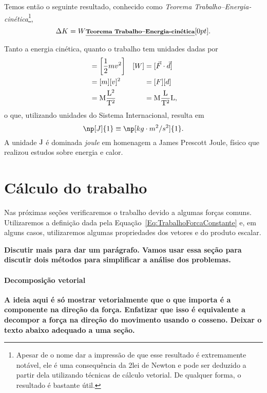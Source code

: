Temos então o seguinte resultado, conhecido como \emph{Teorema Trabalho--Energia-cinética}\footnote[][15mm]{Apesar de o nome dar a impressão de que esse resultado é extremamente notável, ele é uma consequência da 2\textordfeminine lei de Newton e pode ser deduzido a partir dela utilizando técnicas de cálculo vetorial. De qualquer forma, o resultado é bastante útil.},
\begin{equation}
  \Delta K = W \relax{\footnotesize\emph{\textbf{Teorema Trabalho--Energia-cinética}}}[0pt].
\end{equation}

Tanto a energia cinética, quanto o trabalho tem unidades dadas por
\begin{align*}
    [K] &= \left[\frac{1}{2} mv^2\right] & [W] &= [\vec{F}\cdot\vec{d}] \\
    &=[m][v]^2 & &= [F][d] \\
    &=\rm{M}\frac{\rm{L}^2}{\rm{T}^2} & &= \rm{M}\frac{\rm{L}}{\rm{T}^2} \rm{L},
\end{align*}
%
o que, utilizando unidades do Sistema Internacional, resulta em
\begin{equation}
    \np[J]{1} \equiv \np[kg\cdot m^2/s^2]{1}.
\end{equation}
%
A unidade $\rm{J}$ é dominada \emph{joule} em homenagem a James Prescott Joule, físico que realizou estudos sobre energia e calor.

\section{Cálculo do trabalho}

Nas próximas seções verificaremos o trabalho devido a algumas forças comuns. Utilizaremos a definição dada pela Equação~\ref{Eq:TrabalhoForcaConstante} e, em alguns casos, utilizaremos algumas propriedades dos vetores e do produto escalar.

\textbf{Discutir mais para dar um parágrafo. Vamos usar essa seção para discutir dois métodos para simplificar a análise dos problemas.}

\paragraph{Decomposição vetorial}

\textbf{A ideia aqui é só mostrar vetorialmente que o que importa é a componente na direção da força. Enfatizar que isso é equivalente a decompor a força na direção do movimento usando o cosseno. Deixar o texto abaixo adequado a uma seção.}

